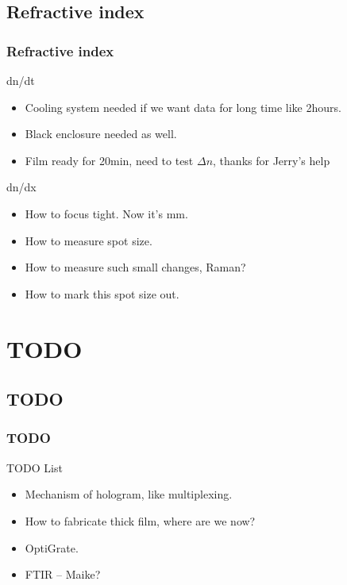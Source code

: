 \documentclass[bigger, english, 10pt, presentation]{beamer}
\begin{document}
\subsection{Refractive index}
\label{sec-3-1}
\begin{frame}
\frametitle{Refractive index}
\label{sec-3-1-1}
\begin{block}{dn/dt}
\label{sec-3-1-1-1}

\begin{itemize}
\item Cooling system needed if we want data for long time like 2hours.
\item Black enclosure needed as well.
\item Film ready for 20min, need to test $\Delta n$, thanks for Jerry's help
\end{itemize}
\end{block}
\begin{block}{dn/dx}
\label{sec-3-1-1-2}

\begin{itemize}
\item How to focus tight. Now it's mm.
\item How to measure spot size.
\item How to measure such small changes, Raman?
\item How to mark this spot size out.
\end{itemize}
\end{block}
\end{frame}
\section{TODO}
\label{sec-4}
\subsection{TODO}
\label{sec-4-1}
\begin{frame}
\frametitle{TODO}
\label{sec-4-1-1}
\begin{block}{TODO List}
\label{sec-4-1-1-1}

\begin{itemize}
\item Mechanism of hologram, like multiplexing.
\item How to fabricate thick film, where are we now?
\item OptiGrate.
\item FTIR -- Maike?
\end{itemize}
\end{block}
\end{frame}
\end{document}

